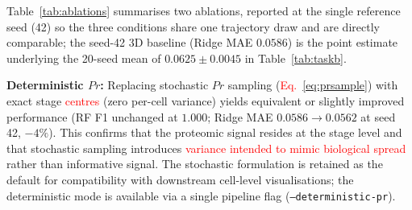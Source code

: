 \documentclass[5p,times,twocolumn]{elsarticle}
\newcommand{\rtag}[1]{}
\newcommand{\rev}[2]{\rtag{#1}\textcolor{red}{#2}}
\newcommand{\lang}[1]{\textcolor{red}{#1}}
\begin{document}
\begin{table}[!htbp]
  \caption{%
    Sensitivity ablations on state-space design choices,
    reported at the single reference seed (42) so that the
    three conditions are directly comparable under one
    trajectory draw; the ``3D stochastic $Pr$'' row is the
    seed-42 point estimate of the 3D condition tabulated as a
    20-seed mean in Tables~\ref{tab:taskb}--\ref{tab:taskb_perdim}.
    Lower Task B MAE is better.}
  \label{tab:ablations}
  \centering
\end{table}

Table~\ref{tab:ablations} summarises two ablations, reported at
the single reference seed (42) so the three conditions share one
trajectory draw and are directly comparable; the seed-42 3D
baseline (Ridge MAE $0.0586$) is the point estimate underlying
the 20-seed mean of $0.0625 \pm 0.0045$ in
Table~\ref{tab:taskb}.

\textbf{Deterministic $Pr$:}
Replacing stochastic $Pr$ sampling
(\rev{AC}{Eq.~\eqref{eq:prsample}}) with exact stage \lang{centres}
(zero per-cell variance) yields equivalent or slightly improved
performance (RF F1 unchanged at $1.000$; Ridge MAE
$0.0586 \to 0.0562$ at seed 42, $-4\%$).
This confirms that the proteomic signal resides at the stage
level and that stochastic sampling introduces
\lang{variance intended to mimic biological spread} rather than informative signal.
The stochastic formulation is retained as the default for
compatibility with downstream cell-level visualisations; the
deterministic mode is available via a single pipeline flag
(\texttt{--deterministic-pr}).
\end{document}
